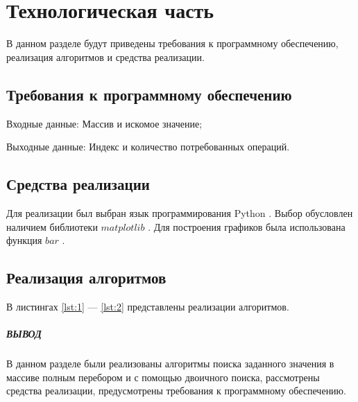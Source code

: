 \chapter{Технологическая часть}

В данном разделе будут приведены требования к программному обеспечению,
реализация алгоритмов и средства реализации.

\section{Требования к программному обеспечению}

Входные данные: Массив и искомое значение;

Выходные данные: Индекс и количество потребованных операций.


\section{Средства реализации}

Для реализации был выбран язык программирования Python \cite{bib2}. Выбор обусловлен наличием библиотеки
$matplotlib$ \cite{bib3}. Для построения графиков была использована функция  $bar$ \cite{bib4}.

\section{Реализация алгоритмов}

В листингах \ref{lst:1} --- \ref{lst:2} представлены реализации алгоритмов.

\begin{center}
\captionsetup{justification=raggedright,singlelinecheck=off}

\end{center}


\begin{center}
\captionsetup{justification=raggedright,singlelinecheck=off}

\end{center}

\paragraph*{ВЫВОД} ${}$ \\

В данном разделе были реализованы алгоритмы поиска заданного значения в массиве
полным перебором и с помощью двоичного поиска, рассмотрены средства реализации, 
предусмотрены требования к программному обеспечению.

\clearpage
